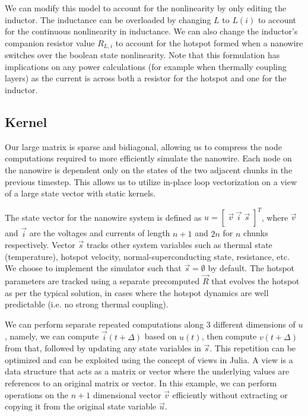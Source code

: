 We can modify this model to account for the nonlinearity by only editing the inductor.
The inductance can be overloaded by changing $L$ to $L(i)$ to account for the continuous 
nonlinearity in inductance. We can also change the inductor's companion resistor value $R_{L, i}$
to account for the hotspot formed when a nanowire switches over the boolean state nonlinearity.
Note that this formulation has implications on any power calculations (for example
when thermally coupling layers) as the current is across both a resistor for the hotspot
and one for the inductor.

\subsection{Kernel}

Our large matrix is sparse and bidiagonal, allowing us to compress the node computations required
to more efficiently simulate the nanowire. Each node on the nanowire is dependent only on the states
of the two adjacent chunks in the previous timestep. This allows us to utilize in-place
loop vectorization on a view of a large state vector with static kernels.

The state vector for the nanowire system is defined as $u = [\; \vec v\; \vec i\; \vec s \;]^T$,
where $\vec v$ and $\vec i$ are the voltages and currents of length $n+1$ and $2n$ for $n$ chunks
respectively. Vector $\vec s$ tracks other system variables such as thermal state (temperature),
hotspot velocity,
normal-superconducting state, resistance, etc. We choose to implement the simulator such that $\vec s = \emptyset$
by default. The hotspot parameters are tracked using a separate precomputed $\vec R$ that
evolves the hotspot as per the typical solution, in cases where the hotspot dynamics are
well predictable (i.e. no strong thermal coupling).

We can perform separate repeated computations along 3 different dimensions of $u$, namely, we can
compute $\vec i(t+\Delta)$ based on $u(t)$, then compute $v(t+\Delta)$ from that, followed by
updating any state variables in $\vec s$. This repetition can be optimized and can be exploited using
the concept of views in Julia. A view is a data structure that acts as a matrix or vector where the
underlying values are references to an original matrix or vector. In this example, we can perform
operations on the $n+1$ dimensional vector $\vec v$ efficiently without extracting or copying it from 
the original state variable $\vec u$. 

